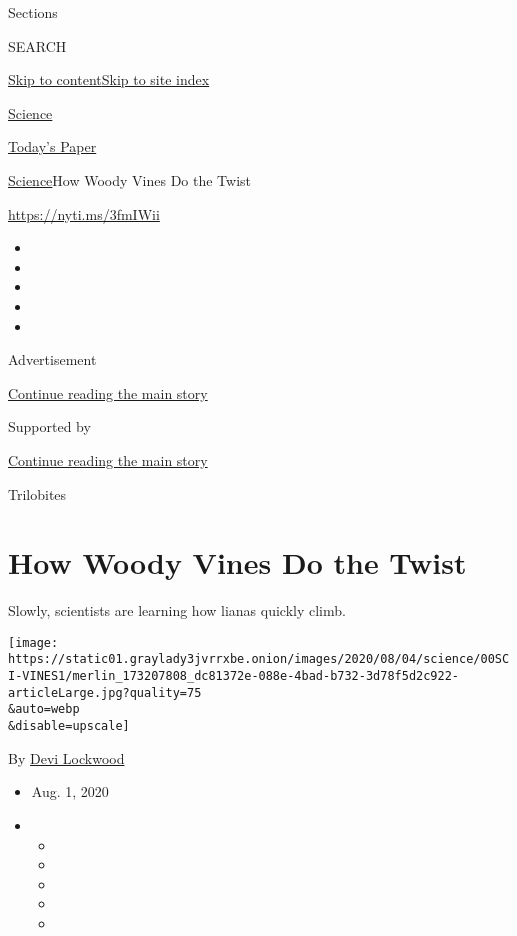 Sections

SEARCH

\protect\hyperlink{site-content}{Skip to
content}\protect\hyperlink{site-index}{Skip to site index}

\href{https://www.nytimes3xbfgragh.onion/section/science}{Science}

\href{https://myaccount.nytimes3xbfgragh.onion/auth/login?response_type=cookie\&client_id=vi}{}

\href{https://www.nytimes3xbfgragh.onion/section/todayspaper}{Today's
Paper}

\href{/section/science}{Science}\textbar{}How Woody Vines Do the Twist

\url{https://nyti.ms/3fmIWii}

\begin{itemize}
\item
\item
\item
\item
\item
\end{itemize}

Advertisement

\protect\hyperlink{after-top}{Continue reading the main story}

Supported by

\protect\hyperlink{after-sponsor}{Continue reading the main story}

Trilobites

\hypertarget{how-woody-vines-do-the-twist}{%
\section{How Woody Vines Do the
Twist}\label{how-woody-vines-do-the-twist}}

Slowly, scientists are learning how lianas quickly climb.

\texttt{[image: https://static01.graylady3jvrrxbe.onion/images/2020/08/04/science/00SCI-VINES1/merlin\_173207808\_dc81372e-088e-4bad-b732-3d78f5d2c922-articleLarge.jpg?quality=75\\\&auto=webp\\\&disable=upscale]}

By \href{https://www.nytimes3xbfgragh.onion/by/devi-lockwood}{Devi
Lockwood}

\begin{itemize}
\item
  Aug. 1, 2020
\item
  \begin{itemize}
  \item
  \item
  \item
  \item
  \item
  \end{itemize}
\end{itemize}

